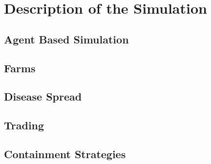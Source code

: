 \chapter{Description of the Simulation}
\section{Agent Based Simulation}
\section{Farms}
\section{Disease Spread}
\section{Trading}
\section{Containment Strategies}
